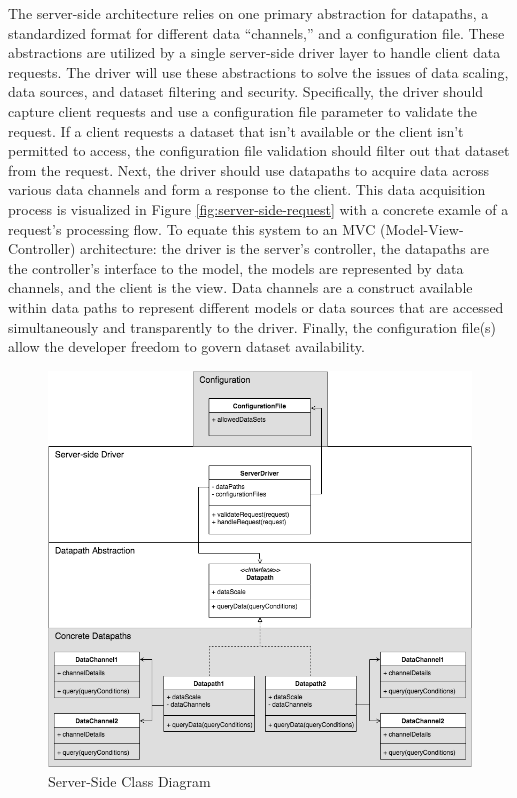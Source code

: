 %
%

The server-side architecture relies on one primary abstraction for datapaths, a standardized format for different data “channels,” and a configuration file.  These abstractions are utilized by a single server-side driver layer to handle client data requests.  The driver will use these abstractions to solve the issues of data scaling, data sources, and dataset filtering and security.  Specifically, the driver should capture client requests and use a configuration file parameter to validate the request.  If a client requests a dataset that isn’t available or the client isn’t permitted to access, the configuration file validation should filter out that dataset from the request. Next, the driver should use datapaths to acquire data across various data channels and form a response to the client.  This data acquisition process is visualized in Figure \ref{fig:server-side-request} with a concrete examle of a request's processing flow.  To equate this system to an MVC (Model-View-Controller) architecture: the driver is the server’s controller, the datapaths are the controller’s interface to the model, the models are represented by data channels, and the client is the view.  Data channels are a construct available within data paths to represent different models or data sources that are accessed simultaneously and transparently to the driver.  Finally, the configuration file(s) allow the developer freedom to govern dataset availability. \par
  \begin{figure}
    \centering
    \includegraphics[width=6in]{images/ServerSideClassDiagram.png}
    \caption{Server-Side Class Diagram}
    \label{fig:server-side-class}
 \end{figure}
